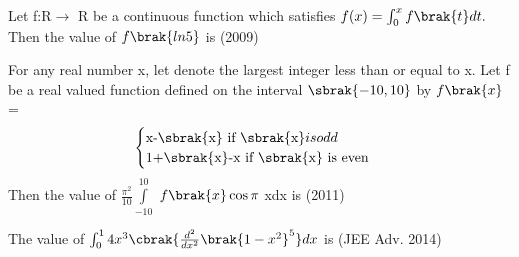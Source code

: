 \iffalse
\title{Assignment 1}
\author{AI24BTECH11014 - Charitha Sri}
\section{integer}
\fi

\item Let f:R$\rightarrow$ R be a continuous function which 
	satisfies $f(x)=\int_{0}^{x}f\brak{t}dt.$ Then the value of $f\brak{        ln5}$ is \hfill{(2009)}
		
         \item For any real number x, let denote the largest integer less than or equal to x. Let f be a real valued function defined on the interval $\sbrak{-10,10}$ by $f\brak{x}$=
		 \[
		 \begin{cases} 
			 $x-\sbrak{x} if \sbrak{x}$ is odd \\ $1+\sbrak{x}-x if \sbrak{x} is even$
                 \end{cases}
	         \]
		Then the value of $\frac{{\pi}^{2}}{10}\int\limits_{-10}^{10}$ $f\brak{x}\cos\pi$ xdx is \hfill{(2011)}


         \item The value of $\int_{0}^{1} 4x^3 \cbrak{\frac{d^2}{dx^2}\brak{1-x^2}^5 }dx$ is \hfill{(JEE Adv. 2014)}


